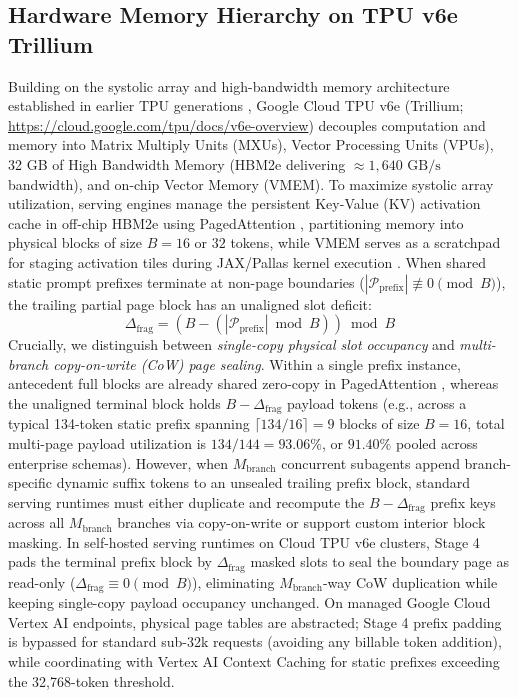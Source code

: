 \documentclass[conference,10pt]{IEEEtran}
\begin{document}
\subsection{Hardware Memory Hierarchy on TPU v6e Trillium}
Building on the systolic array and high-bandwidth memory architecture established in earlier TPU generations \cite{jouppi2023tpu, pope2023efficiently}, Google Cloud TPU v6e (Trillium; \url{https://cloud.google.com/tpu/docs/v6e-overview}) decouples computation and memory into Matrix Multiply Units (MXUs), Vector Processing Units (VPUs), 32 GB of High Bandwidth Memory (HBM2e delivering $\approx 1{,}640\text{ GB/s}$ bandwidth), and on-chip Vector Memory (VMEM). To maximize systolic array utilization, serving engines manage the persistent Key-Value (KV) activation cache in off-chip HBM2e using PagedAttention \cite{kwon2023vllm}, partitioning memory into physical blocks of size $B = 16$ or $32$ tokens, while VMEM serves as a scratchpad for staging activation tiles during JAX/Pallas kernel execution \cite{bradbury2018jax}. When shared static prompt prefixes terminate at non-page boundaries ($|\mathcal{P}_{\text{prefix}}| \not\equiv 0 \pmod B$), the trailing partial page block has an unaligned slot deficit:
\begin{equation}
\label{eq:delta_frag}
\Delta_{\text{frag}} = (B - (|\mathcal{P}_{\text{prefix}}| \bmod B)) \bmod B
\end{equation}
Crucially, we distinguish between \textit{single-copy physical slot occupancy} and \textit{multi-branch copy-on-write (CoW) page sealing}. Within a single prefix instance, antecedent full blocks are already shared zero-copy in PagedAttention \cite{kwon2023vllm}, whereas the unaligned terminal block holds $B - \Delta_{\text{frag}}$ payload tokens (e.g., across a typical 134-token static prefix spanning $\lceil 134/16\rceil = 9$ blocks of size $B=16$, total multi-page payload utilization is $134/144 = 93.06\%$, or $91.40\%$ pooled across enterprise schemas). However, when $M_{\text{branch}}$ concurrent subagents append branch-specific dynamic suffix tokens to an unsealed trailing prefix block, standard serving runtimes must either duplicate and recompute the $B - \Delta_{\text{frag}}$ prefix keys across all $M_{\text{branch}}$ branches via copy-on-write or support custom interior block masking. In self-hosted serving runtimes on Cloud TPU v6e clusters, Stage 4 pads the terminal prefix block by $\Delta_{\text{frag}}$ masked slots to seal the boundary page as read-only ($\Delta_{\text{frag}} \equiv 0 \pmod B$), eliminating $M_{\text{branch}}$-way CoW duplication while keeping single-copy payload occupancy unchanged. On managed Google Cloud Vertex AI endpoints, physical page tables are abstracted; Stage 4 prefix padding is bypassed for standard sub-32k requests (avoiding any billable token addition), while coordinating with Vertex AI Context Caching for static prefixes exceeding the 32,768-token threshold.
\end{document}

